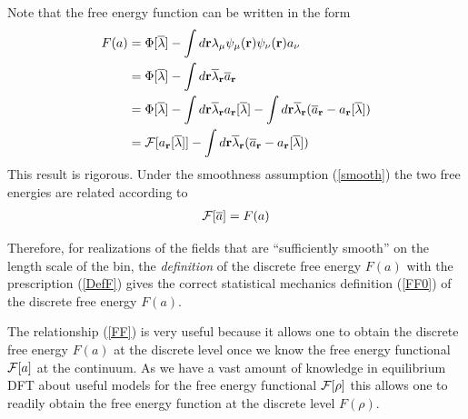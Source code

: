 \documentclass[b5paper,openright,10pt]{book}
\begin{document}
\begin{appendices}
Note that the free energy function can be written in the form
\begin{align}
  F(a) &=\Phi[\overline{\lambda}]-\int d{\bf r}\lambda_\mu\psi_\mu({\bf r})\psi_\nu({\bf r})a_\nu
\nonumber\\
&=\Phi[\overline{\lambda}]-\int d{\bf r}\overline{\lambda}_{\bf r}\overline{a}_{\bf r}
\nonumber\\
&=\Phi[\overline{\lambda}]-\int d{\bf r}\overline{\lambda}_{\bf r}a_{\bf r}[\overline{\lambda}]
-\int d{\bf r}\overline{\lambda}_{\bf r}(\overline{a}_{\bf r}-a_{\bf r}[\overline{\lambda}])
\nonumber\\
&={\cal F}[a_{\bf r}[\overline{\lambda}]]-\int d{\bf r}\overline{\lambda}_{\bf r}(\overline{a}_{\bf r}-a_{\bf r}[\overline{\lambda}])
\end{align}
This result is rigorous. Under the smoothness assumption (\ref{smooth})
the two free energies are related according to
\begin{align}
  {\cal F}[\overline{a}]={F}(a)
\label{FF}
\end{align}

Therefore, for realizations of the fields that
are  ``sufficiently smooth''  on  the  length scale  of  the bin,  the
\textit{definition}  of  the  discrete  free energy  $F(a)$  with  the
prescription  (\ref{DefF})  gives  the correct  statistical  mechanics
definition (\ref{FF0}) of the discrete free energy ${F}(a)$.

The relationship (\ref{FF}) is very useful because it allows one to obtain
the discrete free energy $F(a)$ at the discrete level once we know the
free energy  functional ${\cal F}[a]$ at  the continuum. As we  have a
vast amount  of knowledge in  equilibrium DFT about useful  models for
the free  energy functional  ${\cal F}[\rho]$  this allows one to readily
obtain the free energy function at the discrete level $F(\rho)$.



\end{appendices}
\end{document}
